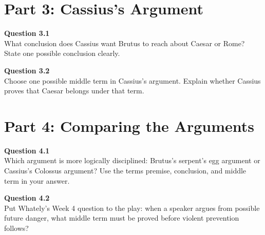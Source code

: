 \documentclass[12pt]{article}
\begin{document}
\newpage

\section*{Part 3: Cassius's Argument}

\textbf{Question 3.1}\\[-0.15em]
What conclusion does Cassius want Brutus to reach about Caesar or Rome? State one possible conclusion clearly.


\textbf{Question 3.2}\\[-0.15em]
Choose one possible middle term in Cassius's argument. Explain whether Cassius proves that Caesar belongs under that term.


\newpage

\section*{Part 4: Comparing the Arguments}

\textbf{Question 4.1}\\[-0.15em]
Which argument is more logically disciplined: Brutus's serpent's egg argument or Cassius's Colossus argument? Use the terms premise, conclusion, and middle term in your answer.


\textbf{Question 4.2}\\[-0.15em]
Put Whately's Week 4 question to the play: when a speaker argues from possible future danger, what middle term must be proved before violent prevention follows?

\end{document}
